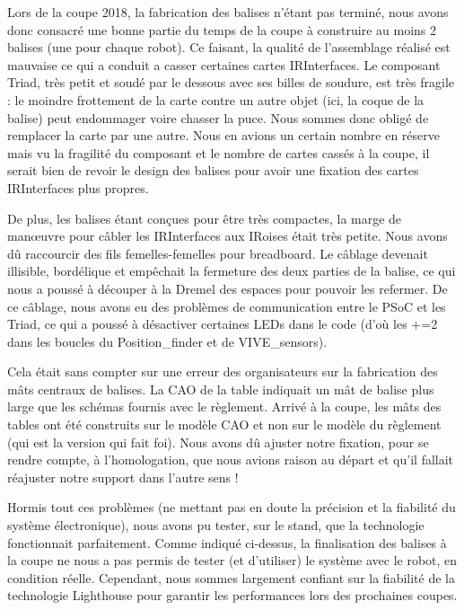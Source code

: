 ﻿Lors de la coupe 2018, la fabrication des balises n'étant pas terminé, nous avons donc consacré une bonne partie du temps de la coupe à construire au moins 2 balises (une pour chaque robot). Ce faisant, la qualité de l'assemblage réalisé est mauvaise ce qui a conduit a casser certaines cartes IRInterfaces. Le composant Triad, très petit et soudé par le dessous avec ses billes de soudure, est très fragile : le moindre frottement de la carte contre un autre objet (ici, la coque de la balise) peut endommager voire chasser la puce. Nous sommes donc obligé de remplacer la carte par une autre. Nous en avions un certain nombre en réserve mais vu la fragilité du composant et le nombre de cartes cassés à la coupe, il serait bien de revoir le design des balises pour avoir une fixation des cartes IRInterfaces plus propres.

De plus, les balises étant conçues pour être très compactes, la marge de manœuvre pour câbler les IRInterfaces aux IRoises était très petite. Nous avons dû raccourcir des fils femelles-femelles pour breadboard. Le câblage devenait illisible, bordélique et empêchait la fermeture des deux parties de la balise, ce qui nous a poussé à découper à la Dremel des espaces pour pouvoir les refermer. De ce câblage, nous avons eu des problèmes de communication entre le PSoC et les Triad, ce qui a poussé à désactiver certaines LEDs dans le code (d'où les +=2 dans les boucles du Position\_finder et de VIVE\_sensors).

Cela était sans compter sur une erreur des organisateurs sur la fabrication des mâts centraux de balises. La CAO de la table indiquait un mât de balise plus large que les schémas fournis avec le règlement. Arrivé à la coupe, les mâts des tables ont été construits sur le modèle CAO et non sur le modèle du règlement (qui est la version qui fait foi). Nous avons dû ajuster notre fixation, pour se rendre compte, à l'homologation, que nous avions raison au départ et qu'il fallait réajuster notre support dans l'autre sens !

Hormis tout ces problèmes (ne mettant pas en doute la précision et la fiabilité du système électronique), nous avons pu tester, sur le stand, que la technologie fonctionnait parfaitement. Comme indiqué ci-dessus, la finalisation des balises à la coupe ne nous a pas permis de tester (et d'utiliser) le système avec le robot, en condition réelle. Cependant, nous sommes largement confiant sur la fiabilité de la technologie Lighthouse pour garantir les performances lors des prochaines coupes.